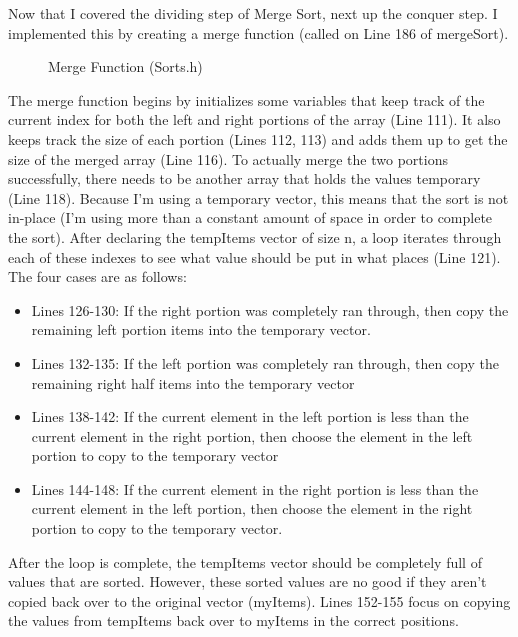 \documentclass[letterpaper, 10pt]{article}
\begin{document}
\noindent
Now that I covered the dividing step of Merge Sort, next up the conquer step. I implemented this by creating a merge function (called on Line 186 of mergeSort).
\begin{figure}[H]
  \centering
  
  \label{fig:figure4.6-part1}
\end{figure}
\begin{figure}[H]
  \centering
  
  \caption{Merge Function (Sorts.h)}
  \label{fig:figure4.6-part2}
\end{figure}
\noindent
The merge function begins by initializes some variables that keep track of the current index for both the left and right portions of the array (Line 111). It also keeps track the size of each portion (Lines 112, 113) and adds them up to get the size of the merged array (Line 116). To actually merge the two portions successfully, there needs to be another array that holds the values temporary (Line 118). Because I'm using a temporary vector, this means that the sort is not in-place (I'm using more than a constant amount of space in order to complete the sort). After declaring the tempItems vector of size n, a loop iterates through each of these indexes to see what value should be put in what places (Line 121). The four cases are as follows:
\begin{itemize}
  \item Lines 126-130: If the right portion was completely ran through, then copy the remaining left portion items into the temporary vector. 
  \item Lines 132-135: If the left portion was completely ran through, then copy the remaining right half items into the temporary vector
  \item Lines 138-142: If the current element in the left portion is less than the current element in the right portion, then choose the element in the left portion to copy to the temporary vector
  \item Lines 144-148: If the current element in the right portion is less than the current element in the left portion, then choose the element in the right portion to copy to the temporary vector.
\end{itemize}
\noindent
After the loop is complete, the tempItems vector should be completely full of values that are sorted. However, these sorted values are no good if they aren't copied back over to the original vector (myItems). Lines 152-155 focus on copying the values from tempItems back over to myItems in the correct positions.
\end{document}
